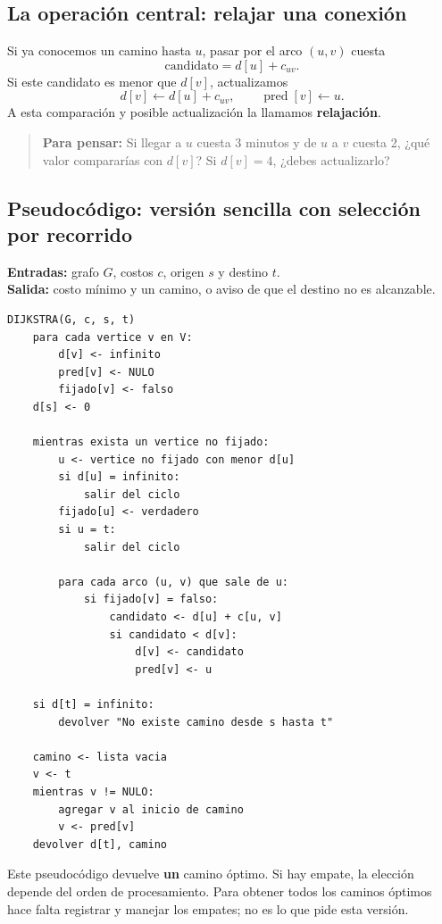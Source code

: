 \documentclass[11pt,letterpaper]{article}
\newcommand{\pregunta}[1]{\begin{quote}\color{verde}\textbf{Para pensar:} #1\end{quote}}
\begin{document}
\subsection{La operación central: relajar una conexión}
Si ya conocemos un camino hasta $u$, pasar por el arco $(u,v)$ cuesta
\[
\text{candidato}=d[u]+c_{uv}.
\]
Si este candidato es menor que $d[v]$, actualizamos
\[
d[v]\leftarrow d[u]+c_{uv},\qquad \operatorname{pred}[v]\leftarrow u.
\]
A esta comparación y posible actualización la llamamos \textbf{relajación}.
\pregunta{Si llegar a $u$ cuesta 3 minutos y de $u$ a $v$ cuesta 2, ¿qué valor compararías con $d[v]$? Si $d[v]=4$, ¿debes actualizarlo?}

\subsection{Pseudocódigo: versión sencilla con selección por recorrido}
\textbf{Entradas:} grafo $G$, costos $c$, origen $s$ y destino $t$.\\
\textbf{Salida:} costo mínimo y un camino, o aviso de que el destino no es alcanzable.
\begin{lstlisting}
DIJKSTRA(G, c, s, t)
    para cada vertice v en V:
        d[v] <- infinito
        pred[v] <- NULO
        fijado[v] <- falso
    d[s] <- 0

    mientras exista un vertice no fijado:
        u <- vertice no fijado con menor d[u]
        si d[u] = infinito:
            salir del ciclo
        fijado[u] <- verdadero
        si u = t:
            salir del ciclo

        para cada arco (u, v) que sale de u:
            si fijado[v] = falso:
                candidato <- d[u] + c[u, v]
                si candidato < d[v]:
                    d[v] <- candidato
                    pred[v] <- u

    si d[t] = infinito:
        devolver "No existe camino desde s hasta t"

    camino <- lista vacia
    v <- t
    mientras v != NULO:
        agregar v al inicio de camino
        v <- pred[v]
    devolver d[t], camino
\end{lstlisting}
Este pseudocódigo devuelve \textbf{un} camino óptimo. Si hay empate, la elección depende del orden de procesamiento. Para obtener todos los caminos óptimos hace falta registrar y manejar los empates; no es lo que pide esta versión.
\end{document}
